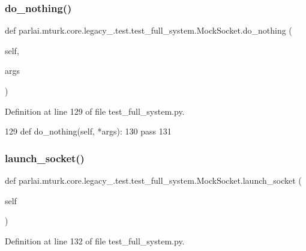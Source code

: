 \subsubsection{\texorpdfstring{do\+\_\+nothing()}{do\_nothing()}}
{\footnotesize\ttfamily def parlai.\+mturk.\+core.\+legacy\+\_.\+test.\+test\+\_\+full\+\_\+system.\+Mock\+Socket.\+do\+\_\+nothing (\begin{DoxyParamCaption}\item[{}]{self,  }\item[{}]{args }\end{DoxyParamCaption})}



Definition at line 129 of file test\+\_\+full\+\_\+system.\+py.


\begin{DoxyCode}
129     \textcolor{keyword}{def }do\_nothing(self, *args):
130         \textcolor{keywordflow}{pass}
131 
\end{DoxyCode}
\mbox{\label{classparlai_1_1mturk_1_1core_1_1legacy__2018_1_1test_1_1test__full__system_1_1MockSocket_aa112de240558ca7b11d5b5b61838b1eb}} 
\subsubsection{\texorpdfstring{launch\+\_\+socket()}{launch\_socket()}}
{\footnotesize\ttfamily def parlai.\+mturk.\+core.\+legacy\+\_.\+test.\+test\+\_\+full\+\_\+system.\+Mock\+Socket.\+launch\+\_\+socket (\begin{DoxyParamCaption}\item[{}]{self }\end{DoxyParamCaption})}



Definition at line 132 of file test\+\_\+full\+\_\+system.\+py.


